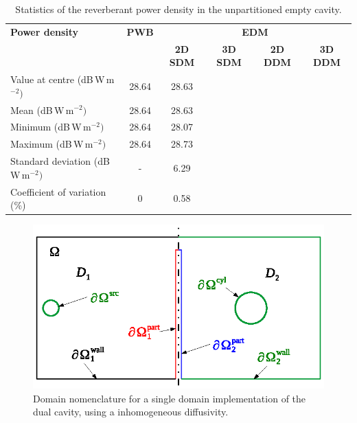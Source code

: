 \documentclass[a4paper]{article}
\numberwithin{equation}{section}
\begin{document}
\begin{table}[ht]
\begin{center}
\begin{tabular}{|l|c|c|c|c|c|}
\hline
\textbf{Power density}               &\textbf{PWB} &\multicolumn{4}{|c|}{\textbf{EDM}} \\ \cline{3-6}
{}                                   &{}           &\textbf{2D SDM} &\textbf{3D SDM} &\textbf{2D DDM} &\textbf{3D DDM} \\
\hline
Value at centre (dB\,W\,m$^{-2})$    &28.64        &28.63           &{}              &{}              &{} \\
Mean (dB\,W\,m$^{-2})$               &28.64        &28.63           &{}              &{}              &{} \\
Minimum (dB\,W\,m$^{-2})$            &28.64        &28.07           &{}              &{}              &{} \\
Maximum (dB\,W\,m$^{-2})$            &28.64        &28.73           &{}              &{}              &{} \\
Standard deviation (dB\,W\,m$^{-2})$ &-            &6.29            &{}              &{}              &{} \\
Coefficient of variation (\%)        &0            &0.58            &{}              &{}              &{} \\
\hline
\end{tabular}
\end{center}
\caption{\label{tb:emptypart} Statistics of the reverberant power density in the unpartitioned empty cavity.}
\end{table}

\begin{figure}[ht]
\begin{center}
\includegraphics[width=0.6\linewidth]{figures/domains1}
\vspace{-4mm}
\caption{\label{fg:tcdom1} Domain nomenclature for a single domain implementation of the dual cavity, using
a inhomogeneous diffusivity.}
\end{center}
\end{figure}
\end{document}
